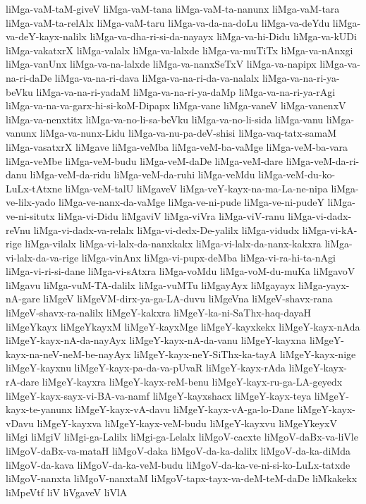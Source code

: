 {liMga-vaM-taM-giveV
liMga-vaM-tana
liMga-vaM-ta-nanunx
liMga-vaM-tara
liMga-vaM-ta-relAlx
liMga-vaM-taru
liMga-va-da-na-doLu
liMga-va-deYdu
liMga-va-deY-kayx-nalilx
liMga-va-dha-ri-si-da-nayayx
liMga-va-hi-Didu
liMga-va-kUDi
liMga-vakatxrX
liMga-valalx
liMga-va-lalxde
liMga-va-muTiTx
liMga-va-nAnxgi
liMga-vanUnx
liMga-va-na-lalxde
liMga-va-nanxSeTxV
liMga-va-napipx
liMga-va-na-ri-daDe
liMga-va-na-ri-dava
liMga-va-na-ri-da-va-nalalx
liMga-va-na-ri-ya-beVku
liMga-va-na-ri-yadaM
liMga-va-na-ri-ya-daMp
liMga-va-na-ri-ya-rAgi
liMga-va-na-va-garx-hi-si-koM-Dipapx
liMga-vane
liMga-vaneV
liMga-vanenxV
liMga-va-nenxtitx
liMga-va-no-li-sa-beVku
liMga-va-no-li-sida
liMga-vanu
liMga-vanunx
liMga-va-nunx-Lidu
liMga-va-nu-pa-deV-shisi
liMga-vaq-tatx-samaM
liMga-vasatxrX
liMgave
liMga-veMba
liMga-veM-ba-vaMge
liMga-veM-ba-vara
liMga-veMbe
liMga-veM-budu
liMga-veM-daDe
liMga-veM-dare
liMga-veM-da-ri-danu
liMga-veM-da-ridu
liMga-veM-da-ruhi
liMga-veMdu
liMga-veM-du-ko-LuLx-tAtxne
liMga-veM-talU
liMgaveV
liMga-veY-kayx-na-ma-La-ne-nipa
liMga-ve-lilx-yado
liMga-ve-nanx-da-vaMge
liMga-ve-ni-pude
liMga-ve-ni-pudeY
liMga-ve-ni-situtx
liMga-vi-Didu
liMgaviV
liMga-viVra
liMga-viV-ranu
liMga-vi-dadx-reVnu
liMga-vi-dadx-va-relalx
liMga-vi-dedx-De-yalilx
liMga-vidudx
liMga-vi-kA-rige
liMga-vilalx
liMga-vi-lalx-da-nanxkakx
liMga-vi-lalx-da-nanx-kakxra
liMga-vi-lalx-da-va-rige
liMga-vinAnx
liMga-vi-pupx-deMba
liMga-vi-ra-hi-ta-nAgi
liMga-vi-ri-si-dane
liMga-vi-sAtxra
liMga-voMdu
liMga-voM-du-muKa
liMgavoV
liMgavu
liMga-vuM-TA-dalilx
liMga-vuMTu
liMgayAyx
liMgayayx
liMga-yayx-nA-gare
liMgeV
liMgeVM-dirx-ya-ga-LA-duvu
liMgeVna
liMgeV-shavx-rana
liMgeV-shavx-ra-nalilx
liMgeY-kakxra
liMgeY-ka-ni-SaThx-haq-dayaH
liMgeYkayx
liMgeYkayxM
liMgeY-kayxMge
liMgeY-kayxkekx
liMgeY-kayx-nAda
liMgeY-kayx-nA-da-nayAyx
liMgeY-kayx-nA-da-vanu
liMgeY-kayxna
liMgeY-kayx-na-neV-neM-be-nayAyx
liMgeY-kayx-neY-SiThx-ka-tayA
liMgeY-kayx-nige
liMgeY-kayxnu
liMgeY-kayx-pa-da-va-pUvaR
liMgeY-kayx-rAda
liMgeY-kayx-rA-dare
liMgeY-kayxra
liMgeY-kayx-reM-benu
liMgeY-kayx-ru-ga-LA-geyedx
liMgeY-kayx-sayx-vi-BA-va-namf
liMgeY-kayxshacx
liMgeY-kayx-teya
liMgeY-kayx-te-yanunx
liMgeY-kayx-vA-davu
liMgeY-kayx-vA-ga-lo-Dane
liMgeY-kayx-vDavu
liMgeY-kayxva
liMgeY-kayx-veM-budu
liMgeY-kayxvu
liMgeYkeyxV
liMgi
liMgiV
liMgi-ga-Lalilx
liMgi-ga-Lelalx
liMgoV-cacxte
liMgoV-daBx-va-liVle
liMgoV-daBx-va-mataH
liMgoV-daka
liMgoV-da-ka-dalilx
liMgoV-da-ka-diMda
liMgoV-da-kava
liMgoV-da-ka-veM-budu
liMgoV-da-ka-ve-ni-si-ko-LuLx-tatxde
liMgoV-nanxta
liMgoV-nanxtaM
liMgoV-tapx-tayx-va-deM-teM-daDe
liMkakekx
liMpeVtf
liV
liVgaveV
liVlA
}
